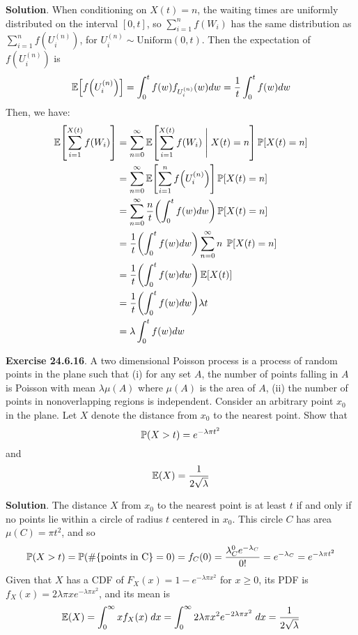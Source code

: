 \textbf{Solution}.
When conditioning on \(X(t) = n\), the waiting times are uniformly
distributed on the interval \([0, t]\), so \(\sum_{i=1}^{n} f(W_{i})\) has
the same distribution as \(\sum_{i=1}^{n} f\left(U_{i}^{(n)}\right)\), for
\(U_{i}^{(n)} \sim \text{Uniform}(0, t)\). Then the expectation of
\(f\left(U_{i}^{(n)}\right)\) is
\[
\EXP\left[ f\left(U_{i}^{(n)}\right) \right] = \int_{0}^t f(w) f_{U_{i}^{(n)}}(w) dw = \frac{1}{t} \int_{0}^t f(w) dw
\]
Then, we have:
\begin{align*}
\EXP\left[ \sum_{i=1}^{X(t)} f(W_{i}) \right] 
&= \sum_{n = 0}^{\infty} \EXP\left[ \sum_{i=1}^{X(t)} f(W_{i}) \; \Bigg| \; X(t) = n\right] \PROB \left[ X(t) = n \right] \\
&= \sum_{n = 0}^{\infty} \EXP\left[ \sum_{i=1}^{n} f\left(U_{i}^{(n)}\right) \right] \PROB \left[ X(t) = n \right] \\
&= \sum_{n = 0}^{\infty} \frac{n}{t} \left( \int_{0}^t f(w) dw \right) \PROB \left[ X(t) = n \right] \\
&= \frac{1}{t} \left( \int_{0}^t f(w) dw \right) \sum_{n=0}^{\infty} n \; \PROB \left[ X(t) = n \right] \\
&= \frac{1}{t} \left( \int_{0}^t f(w) dw \right) \EXP \left[ X(t) \right] \\
&= \frac{1}{t} \left( \int_{0}^t f(w) dw \right) \lambda t \\
&= \lambda \int_{0}^t f(w) dw
\end{align*}

\textbf{Exercise 24.6.16}. A two dimensional Poisson process is a
process of random points in the plane such that (i) for any set \(A\),
the number of points falling in \(A\) is Poisson with mean
\(\lambda \mu(A)\) where \(\mu(A)\) is the area of \(A\), (ii) the
number of points in nonoverlapping regions is independent. Consider an
arbitrary point \(x_{0}\) in the plane. Let \(X\) denote the distance from
\(x_{0}\) to the nearest point. Show that
\[
\operatorname{\mathbb{P}}(X > t) = e^{-\lambda \pi t^{2}}
\]
and
\[
\operatorname{\mathbb{E}}(X) = \frac{1}{2 \sqrt{\lambda}}
\]

\textbf{Solution}. The distance \(X\) from \(x_{0}\) to the nearest point
is at least \(t\) if and only if no points lie within a circle of radius
\(t\) centered in \(x_{0}\). This circle \(C\) has area
\(\mu(C) = \pi t^{2}\), and so
\[
\operatorname{\mathbb{P}}(X > t) = \operatorname{\mathbb{P}}(\# \{\text{points in C} \} = 0) = f_C(0) = \frac{\lambda_C^{0} e^{-\lambda_C}}{0!} = e^{-\lambda_C} = e^{-\lambda \pi t^{2}}
\]
Given that \(X\) has a CDF of \(F_X(x) = 1 - e^{-\lambda \pi x^{2}}\) for
\(x \geq 0\), its PDF is
\(f_X(x) = 2 \lambda \pi x e^{-\lambda \pi x^{2}}\), and its mean is
\[
\operatorname{\mathbb{E}}(X) = \int_{0}^{\infty} x f_X(x) \; dx  = \int_{0}^{\infty} 2 \lambda \pi x^{2} e^{-2 \lambda \pi x^{2}} \; dx = \frac{1}{2 \sqrt{\lambda}}
\]
